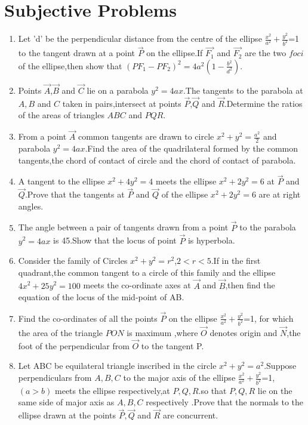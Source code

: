 \documentclass[journal]{IEEEtran}
\numberwithin{equation}{enumi}
\numberwithin{figure}{enumi}
\begin{document}
\section{Subjective Problems}
\begin{enumerate}
\item Let 'd' be the perpendicular distance from the centre of the ellipse $\frac{x^2}{a^2}+\frac{y^2}{b^2}$=1  to the tangent drawn at a point $\Vec{P}$ on the ellipse.If $\Vec{F_1}$ and       $\Vec{F_2}$ are the two $foci$ of the ellipse,then show that $(PF_1-PF_2)^2=4a^2(1-\frac{b^2}{d^2})$.
\hfill{}

\item Points $\Vec{A}$,$\Vec{B}$ and $\Vec{C}$ lie on a parabola $y^2=4ax$.The tangents to the parabola at $A,B$ and $C$ taken in pairs,intersect at points $\Vec{P}$,$\Vec{Q}$ and $\Vec{R}$.Determine the ratios of the areas of triangles $ABC$ and $PQR$. \hfill{}
\item From a point $\Vec{A}$ common tangents  are drawn to circle $x^2+y^2=\frac{a^2}{2}$ and parabola $y^2=4ax$.Find the area of the quadrilateral formed by the common tangents,the chord of contact of circle and the chord of contact of parabola.
\hfill{}
\item A tangent to the ellipse $x^2+4y^2=4$ meets the ellipse $x^2+2y^2=6$ at $\Vec{P}$ and $\Vec{Q}$.Prove that the tangents at $\Vec{P}$ and $\Vec{Q}$ of the ellipse $x^2+2y^2=6$ are at right angles.
\hfill{}
\item The angle between a pair of tangents drawn from a point $\Vec{P}$ to the parabola $y^2=4ax$ is 45\degree .Show that the locus of point $\Vec{P}$ is hyperbola.
\hfill{}
\item Consider the family of Circles $x^2+y^2=r^2$,$2<r<5$.If in the first quadrant,the common tangent to a circle of this family and the ellipse $4x^2+25y^2=100$ meets the co-ordinate axes at $\Vec{A}$ and $\Vec{B}$,then find the equation of the locus of the mid-point  of AB.
\hfill{}
\item Find the co-ordinates of all the points $\Vec{P}$ on the ellipse $\frac{x^2}{a^2}+\frac{y^2}{b^2}$=1, for which the area of the triangle $PON$ is maximum ,where $\Vec{O}$ denotes origin  and $\Vec{N}$,the foot of the perpendicular from $\vec{O}$ to the tangent P.
\hfill{}
\item  Let ABC be equilateral triangle inscribed in the circle $x^2+y^2=a^2$.Suppose perpendiculars from $A,B,C$ to the major axis of the ellipse $\frac{x^2}{a^2}+\frac{y^2}{b^2}$=1,$(a>b)$ meets the ellipse respectively,at $P,Q,R$.so that $P,Q,R$ lie on the same side of major axis as $A,B,C$ respectively .Prove that the normals to the ellipse drawn at the points $\vec{P},\vec{Q}$ and $\vec{R}$ are concurrent.

\end{enumerate}
\end{document}
